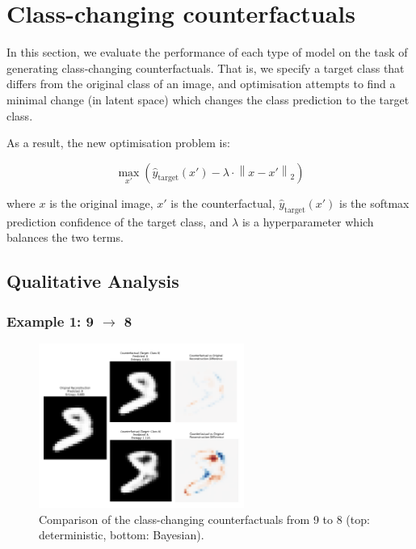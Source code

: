 \documentclass{article}
\begin{document}
\section{Class-changing counterfactuals}

In this section, we evaluate the performance of each type of model on the task of generating class-changing counterfactuals. That is, we specify a target class that differs from the original class of an image, and optimisation attempts to find a minimal change (in latent space) which changes the class prediction to the target class.

As a result, the new optimisation problem is:

\begin{equation}
    \max_{x'} \left( \hat{y}_{\text{target}}(x') - \lambda \cdot \left\| x - x' \right\|_2 \right)
\end{equation}

where $x$ is the original image, $x'$ is the counterfactual, $\hat{y}_{\text{target}}(x')$ is the softmax prediction confidence of the target class, and $\lambda$ is a hyperparameter which balances the two terms.


\subsection{Qualitative Analysis}
\subsubsection{Example 1: 9 \texorpdfstring{$\rightarrow$}{to} 8}

\begin{figure}[H]
    \centering
    \includegraphics[width=0.6\textwidth]{figures/Class/9to8_comparison.png}
    \caption{Comparison of the class-changing counterfactuals from 9 to 8 (top: deterministic, bottom: Bayesian).}
    \label{fig:cc_qualitative_9to8}
\end{figure}
\end{document}
